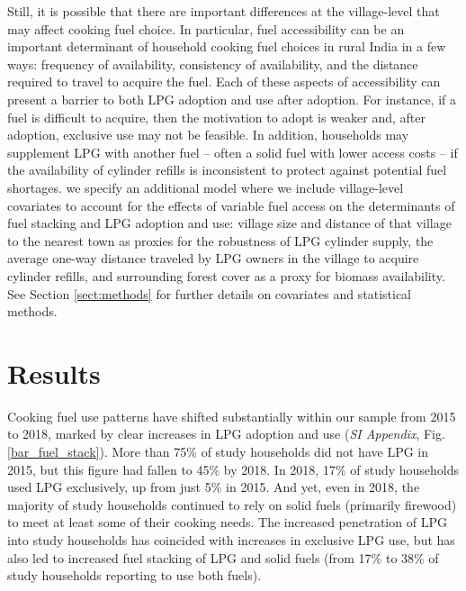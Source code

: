 \documentclass[11pt,english]{article}
\theoremstyle{plain} \newtheorem{claim}{Claim}
\theoremstyle{plain} \newtheorem{prop}{Proposition}
\theoremstyle{plain} \newtheorem{hypo}{Hypothesis}
\begin{document}
Still, it is possible that there are important differences at the village-level that may affect cooking fuel choice. In particular, fuel accessibility can be an important determinant of household cooking fuel choices in rural India in a few ways: frequency of availability, consistency of availability, and the distance required to travel to acquire the fuel\citep{Puzzoloetal2016,Kumar2016}. Each of these aspects of accessibility can present a barrier to both LPG adoption and use after adoption. For instance, if a fuel is difficult to acquire, then the motivation to adopt is weaker and, after adoption, exclusive use may not be feasible. In addition, households may supplement LPG with another fuel -- often a solid fuel with lower access costs -- if the availability of cylinder refills is inconsistent to protect against potential fuel shortages\citep{Gouldetal2020}. we specify an additional model where we include village-level covariates to account for the effects of variable fuel access on the determinants of fuel stacking and LPG adoption and use: village size and distance of that village to the nearest town as proxies for the robustness of LPG cylinder supply, the average one-way distance traveled by LPG owners in the village to acquire cylinder refills, and surrounding forest cover as a proxy for biomass availability. See Section \ref{sect:methods} for further details on covariates and statistical methods. 


\section*{Results}

Cooking fuel use patterns have shifted substantially within our sample from 2015 to 2018, marked by clear increases in LPG adoption and use (\textit{SI Appendix}, Fig. \ref{bar_fuel_stack}). More than 75\% of study households did not have LPG in 2015, but this figure had fallen to 45\% by 2018. In 2018, 17\% of study households used LPG exclusively, up from just 5\% in 2015. And yet, even in 2018, the majority of study households continued to rely on solid fuels (primarily firewood) to meet at least some of their cooking needs. The increased penetration of LPG into study households has coincided with increases in exclusive LPG use, but has also led to increased fuel stacking of LPG and solid fuels (from 17\% to 38\% of study households reporting to use both fuels).
\end{document}
